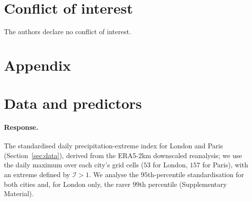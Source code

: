 \documentclass[11pt,a4paper]{article}
\newcommand{\Ind}{\mathcal{I}}                 %
\begin{document}
\section*{Conflict of interest}
The authors declare no conflict of interest.



\appendix
\section*{Appendix}
\section{Data and predictors}\label{app:data}

\paragraph{Response.} The standardised daily precipitation-extreme index for
London and Paris (Section~\ref{sec:data}), derived from the ERA5-2km downscaled
reanalysis; we use the daily maximum over each city's grid cells ($53$ for London,
$157$ for Paris), with an extreme defined by $\Ind>1$. We analyse the
$95$th-percentile standardisation for both cities and, for London only, the rarer
$99$th percentile (Supplementary Material).
\end{document}
